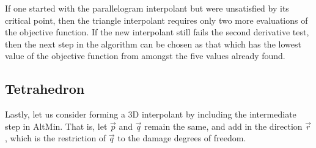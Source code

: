 \documentclass{article}
\numberwithin{equation}{section}
\begin{document}
If one started with the parallelogram interpolant but were unsatisfied by its critical point, then the triangle interpolant requires only two more evaluations of the objective function.
If the new interpolant still fails the second derivative test, then the next step in the algorithm can be chosen as that which has the lowest value of the objective function from amongst the five values already found.

\subsection{Tetrahedron}
\label{subsec: tet}

Lastly, let us consider forming a 3D interpolant by including the intermediate step in AltMin.
That is, let $\vec{p}$ and $\vec{q}$ remain the same, and add in the direction $\vec{r}$, which is the restriction of $\vec{q}$ to the damage degrees of freedom.
\end{document}
